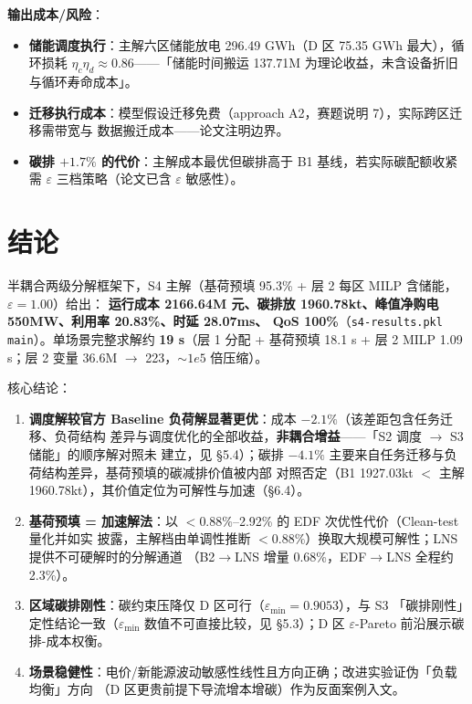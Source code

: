 \documentclass{internal-report}
\begin{document}
\textbf{输出成本/风险}：
\begin{itemize}
  \item \textbf{储能调度执行}：主解六区储能放电 296.49 GWh（D 区 75.35 GWh 最大），循环损耗
        $\eta_c\eta_d\approx0.86$——「储能时间搬运 137.71M 为理论收益，未含设备折旧与循环寿命成本」。
  \item \textbf{迁移执行成本}：模型假设迁移免费（approach A2，赛题说明 7），实际跨区迁移需带宽与
        数据搬迁成本——论文注明边界。
  \item \textbf{碳排 $+1.7\%$ 的代价}：主解成本最优但碳排高于 B1 基线，若实际碳配额收紧需 $\varepsilon$
        三档策略（论文已含 $\varepsilon$ 敏感性）。
\end{itemize}

\section{结论}
\label{sec:concl}

半耦合两级分解框架下，S4 主解（基荷预填 95.3\% + 层 2 每区 MILP 含储能，$\varepsilon{=}1.00$）给出：
\textbf{运行成本 2166.64M 元、碳排放 1960.78kt、峰值净购电 550MW、利用率 20.83\%、时延 28.07ms、
QoS 100\%}（\texttt{s4-results.pkl} \texttt{main}）。单场景完整求解约 \textbf{19 s}（层 1 分配 +
基荷预填 18.1 s + 层 2 MILP 1.09 s；层 2 变量 36.6M $\to$ 223，$\sim 1e5$ 倍压缩）。

核心结论：
\begin{enumerate}
  \item \textbf{调度解较官方 Baseline 负荷解显著更优}：成本 $-2.1\%$（该差距包含任务迁移、负荷结构
        差异与调度优化的全部收益，\textbf{非耦合增益}——「S2 调度 $\to$ S3 储能」的顺序解对照未
        建立，见 §5.4）；碳排 $-4.1\%$ 主要来自任务迁移与负荷结构差异，基荷预填的碳减排价值被内部
        对照否定（B1 1927.03kt $<$ 主解 1960.78kt），其价值定位为可解性与加速（§6.4）。
  \item \textbf{基荷预填 = 加速解法}：以 $<0.88\%$--2.92\% 的 EDF 次优性代价（Clean-test 量化并如实
        披露，主解档由单调性推断 $<0.88\%$）换取大规模可解性；LNS 提供不可硬解时的分解通道
        （B2$\to$LNS 增量 0.68\%，EDF$\to$LNS 全程约 2.3\%）。
  \item \textbf{区域碳排刚性}：碳约束压降仅 D 区可行（$\varepsilon_{\min}{=}0.9053$），与 S3
        「碳排刚性」定性结论一致（$\varepsilon_{\min}$ 数值不可直接比较，见 §5.3）；D 区
        $\varepsilon$-Pareto 前沿展示碳排-成本权衡。
  \item \textbf{场景稳健性}：电价/新能源波动敏感性线性且方向正确；改进实验证伪「负载均衡」方向
        （D 区更贵前提下导流增本增碳）作为反面案例入文。
\end{enumerate}
\end{document}
